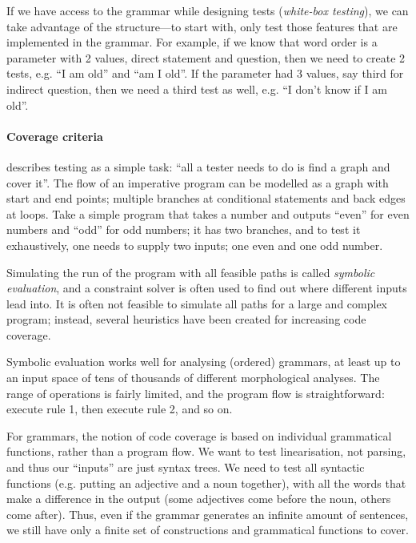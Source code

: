 If we have access to the grammar while designing tests
(\emph{white-box testing}), we can take advantage of the
structure---to start with, only test those features that are
implemented in the grammar. For example, if we know that word order is
a parameter with 2 values, direct statement and question,
then we need to create 2 tests, e.g. ``I am old'' and ``am I
old''. If the parameter had 3 values, say third for indirect question,
then we need a third test as well, e.g. ``I don't know if I am old''.



\paragraph{Coverage criteria}

\citet{beizer2003software} describes testing as a
simple task: ``all a tester needs to do is find a graph and cover
it''. The flow of an imperative program can be modelled as a graph
with start and end points; multiple branches at conditional statements
and back edges at loops. Take a simple program that takes a number and
outputs ``even'' for even numbers and ``odd'' for odd numbers; it has
two branches, and to test it exhaustively, one needs to supply two
inputs; one even and one odd number.

Simulating the run of the program with all feasible paths is called
\emph{symbolic evaluation}, and a constraint solver is often used to
find out where different inputs lead into. It is often not feasible to
simulate all paths for a large and complex program; instead, several
heuristics have been created for increasing code coverage.

Symbolic evaluation works well for analysing (ordered) \onlycg{} grammars, at
least up to an input space of tens of thousands of different
morphological analyses. The range of operations is fairly limited, and
the program flow is straightforward: execute rule 1, then execute
rule 2, and so on.

For \gf{} grammars, the notion of code coverage is based on individual
grammatical functions, rather than a program flow. We want to test
linearisation, not parsing, and thus our ``inputs'' are just syntax
trees.  We need to test all syntactic functions (e.g. putting an
adjective and a noun together), with all the words that make a
difference in the output (some adjectives come before the noun, others
come after). Thus, even if the grammar generates an infinite amount of
sentences, we still have only a finite set of constructions and
grammatical functions to cover.



